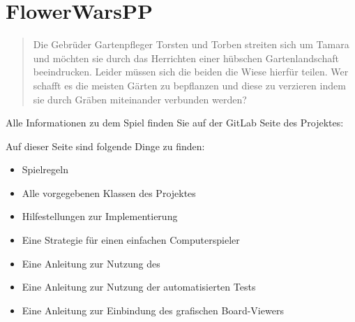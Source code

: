 \section*{FlowerWarsPP}
\begin{quote}
Die Gebrüder Gartenpfleger Torsten und Torben streiten sich um Tamara und möchten sie durch das Herrichten einer hübschen Gartenlandschaft beeindrucken. Leider müssen sich die beiden die Wiese hierfür teilen. Wer schafft es die meisten Gärten zu bepflanzen und diese zu verzieren indem sie durch Gräben miteinander verbunden werden?
\end{quote}

Alle Informationen zu dem Spiel finden Sie auf der GitLab Seite des Projektes:

\href{https://gitlab.gwdg.de/app/flowerwarspp}{}

\bigskip
\bigskip

Auf dieser Seite sind folgende Dinge zu finden:
\begin{itemize}
\item Spielregeln
\item Alle vorgegebenen Klassen des Projektes
\item Hilfestellungen zur Implementierung
\item Eine Strategie für einen einfachen Computerspieler
\item Eine Anleitung zur Nutzung des 
\item Eine Anleitung zur Nutzung der automatisierten Tests
\item Eine Anleitung zur Einbindung des grafischen Board-Viewers
\end{itemize}